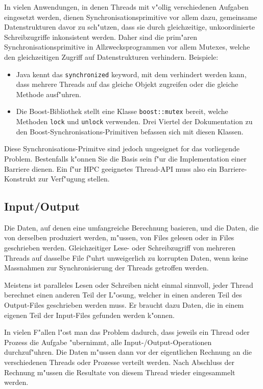 In vielen Anwendungen, in denen Threads mit v"ollig verschiedenen
Aufgaben eingesetzt werden, dienen Synchronisationsprimitive vor allem
dazu, gemeinsame Datenstrukturen davor zu sch"utzen, dass sie durch
gleichzeitige, unkoordinierte Schreibzugriffe inkonsistent werden.
Daher sind die prim"aren Synchronisationsprimitive in Allzwecksprogrammen
vor allem Mutexes, welche den gleichzeitigen Zugriff auf Datenstrukturen
verhindern. Beispiele:
\begin{itemize}
\item Java kennt das {\tt synchronized} keyword, mit dem verhindert werden
kann, dass mehrere Threads auf das gleiche Objekt zugreifen
oder die gleiche Methode ausf"uhren.
\item Die Boost-Bibliothek stellt eine Klasse {\tt boost::mutex} bereit,
welche Methoden {\tt lock} und {\tt unlock} verwenden.
Drei Viertel der Dokumentation zu den Boost-Synchronisations-Primitiven
befassen sich mit diesen Klassen.
\end{itemize}

Diese Synchronisations-Primitve sind jedoch ungeeignet for das vorliegende
Problem.
Bestenfalls k"onnen Sie die Basis sein f"ur die Implementation einer
Barriere dienen.
Ein f"ur HPC geeignetes Thread-API muss also ein Barriere-Konstrukt
zur Verf"ugung stellen.

\subsection{Input/Output}
Die Daten, auf denen eine umfangreiche Berechnung basieren, und die
Daten, die von derselben produziert werden, m"ussen, von Files gelesen
oder in Files geschrieben werden.
Gleichzeitiger Lese- oder Schreibzugriff von mehreren Threads auf dasselbe
File f"uhrt unweigerlich zu korrupten Daten, wenn keine Massnahmen zur
Synchronisierung der Threads getroffen werden. 

Meistens ist paralleles Lesen oder Schreiben nicht einmal sinnvoll, 
jeder Thread berechnet einen anderen Teil der L"osung, welcher in
einen anderen Teil des Output-Files geschrieben werden muss.
Er braucht dazu Daten, die in einem eigenen Teil der Input-Files
gefunden werden k"onnen.

In vielen F"allen l"ost man das Problem dadurch, dass jeweils ein Thread
oder Prozess die Aufgabe "ubernimmt, alle Input-/Output-Operationen
durchzuf"uhren.
Die Daten m"ussen dann vor der eigentlichen Rechnung an die verschiedenen
Threads oder Prozesse verteilt werden.
Nach Abschluss der Rechnung m"ussen die Resultate von diesem Thread wieder
eingesammelt werden.

